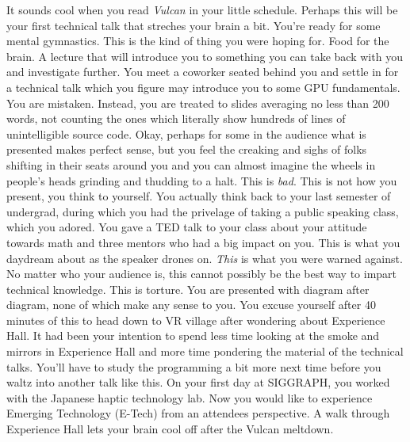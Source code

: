\documentclass[../main.tex]{subfiles}
\begin{document}
It sounds cool when you read \textit{Vulcan} in your little schedule. Perhaps this will be your first technical talk that streches your brain a bit. You're ready for some mental gymnastics. This is the kind of thing you were hoping for. Food for the brain. A lecture that will introduce you to something you can take back with you and investigate further. You meet a coworker seated behind you and settle in for a technical talk which you figure may introduce you to some GPU fundamentals. You are mistaken. Instead, you are treated to slides averaging no less than 200 words, not counting the ones which literally show hundreds of lines of unintelligible source code. Okay, perhaps for some in the audience what is presented makes perfect sense, but you feel the creaking and sighs of folks shifting in their seats around you and you can almost imagine the wheels in people's heads grinding and thudding to a halt. This is \textit{bad}. This is not how you present, you think to yourself. You actually think back to your last semester of undergrad, during which you had the privelage of taking a public speaking class, which you adored. You gave a TED talk to your class about your attitude towards math and three mentors who had a big impact on you. This is what you daydream about as the speaker drones on. \textit{This} is what you were warned against. No matter who your audience is, this cannot possibly be the best way to impart technical knowledge. This is torture. You are presented with diagram after diagram, none of which make any sense to you. You excuse yourself after 40 minutes of this to head down to VR village after wondering about Experience Hall. It had been your intention to spend less time looking at the smoke and mirrors in Experience Hall and more time pondering the material of the technical talks. You'll have to study the programming a bit more next time before you waltz into another talk like this. On your first day at SIGGRAPH, you worked with the Japanese haptic technology lab. Now you would like to experience Emerging Technology (E-Tech) from an attendees perspective. A walk through Experience Hall lets your brain cool off after the Vulcan meltdown.
\end{document}
